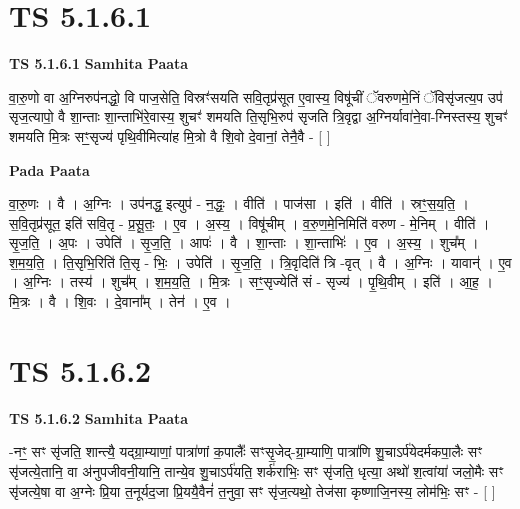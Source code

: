 \documentclass[17pt]{extarticle}
\begin{document}

\section{ TS 5.1.6.1 }

\textbf{TS 5.1.6.1 } \newline
\textbf{Samhita Paata} \newline

वा॒रु॒णो वा अ॒ग्निरुप॑नद्धो॒ वि पाज॒सेति॒ विस्रꣳ॑सयति सवि॒तृप्र॑सूत ए॒वास्य॒ विषू॑चीं ॅवरुणमे॒निं ॅविसृ॑जत्य॒प उप॑ सृज॒त्यापो॒ वै शा॒न्ताः शा॒न्ताभि॑रे॒वास्य॒ शुचꣳ॑ शमयति ति॒सृभि॒रुप॑ सृजति त्रि॒वृद्वा अ॒ग्निर्यावा॑ने॒वा-ग्निस्तस्य॒ शुचꣳ॑ शमयति मि॒त्रः सꣳ॒॒सृज्य॑ पृथि॒वीमित्या॑ह मि॒त्रो वै शि॒वो दे॒वानां॒ तेनै॒वै - [  ] \newline

\textbf{Pada Paata} \newline

वा॒रु॒णः । वै । अ॒ग्निः । उप॑नद्ध॒ इत्युप॑ - न॒द्धः॒ । वीति॑ । पाज॑सा । इति॑ । वीति॑ । स्रꣳ॒॒स॒य॒ति॒ । स॒वि॒तृप्र॑सूत॒ इति॑ सवि॒तृ - प्र॒सू॒तः॒ । ए॒व । अ॒स्य॒ । विषू॑चीम् । व॒रु॒ण॒मे॒निमिति॑ वरुण - मे॒निम् । वीति॑ । सृ॒ज॒ति॒ । अ॒पः । उपेति॑ । सृ॒ज॒ति॒ । आपः॑ । वै । शा॒न्ताः । शा॒न्ताभिः॑ । ए॒व । अ॒स्य॒ । शुच᳚म् । श॒म॒य॒ति॒ । ति॒सृभि॒रिति॑ ति॒सृ - भिः॒ । उपेति॑ । सृ॒ज॒ति॒ । त्रि॒वृदिति॑ त्रि -वृत् । वै । अ॒ग्निः । यावान्॑ । ए॒व । अ॒ग्निः । तस्य॑ । शुच᳚म् । श॒म॒य॒ति॒ । मि॒त्रः । सꣳ॒॒सृज्येति॑ सं - सृज्य॑ । पृ॒थि॒वीम् । इति॑ । आ॒ह॒ । मि॒त्रः । वै । शि॒वः । दे॒वाना᳚म् । तेन॑ । ए॒व ।  \newline





\section{ TS 5.1.6.2 }

\textbf{TS 5.1.6.2 } \newline
\textbf{Samhita Paata} \newline

-नꣳ॒॒ सꣳ सृ॑जति॒ शान्त्यै॒ यद्ग्रा॒म्याणां॒ पात्रा॑णां क॒पालैः᳚ सꣳसृ॒जेद्-ग्रा॒म्याणि॒ पात्रा॑णि शु॒चाऽर्प॑येदर्मकपा॒लैः सꣳ सृ॑जत्ये॒तानि॒ वा अ॑नुपजीवनी॒यानि॒ तान्ये॒व शु॒चाऽर्प॑यति॒ शर्क॑राभिः॒ सꣳ सृ॑जति॒ धृत्या॒ अथो॑ श॒त्वांया॑ जलो॒मैः सꣳ सृ॑जत्ये॒षा वा अ॒ग्नेः प्रि॒या त॒नूर्यद॒जा प्रि॒ययै॒वैनं॑ त॒नुवा॒ सꣳ सृ॑ज॒त्यथो॒ तेज॑सा कृष्णाजि॒नस्य॒ लोम॑भिः॒ सꣳ - [  ] \newline
\end{document}
